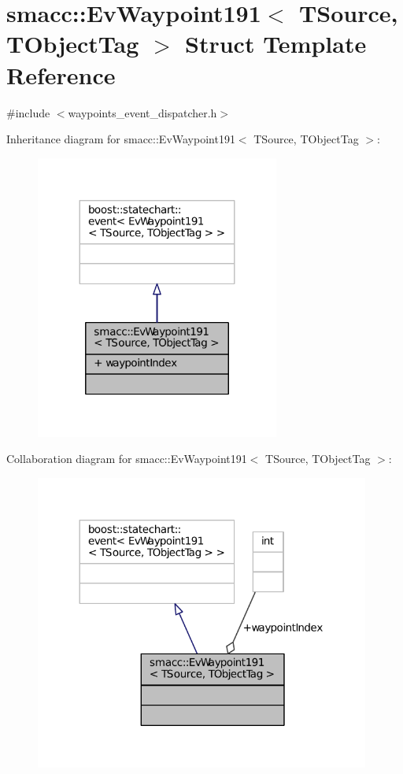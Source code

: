 \hypertarget{structsmacc_1_1EvWaypoint191}{}\section{smacc\+:\+:Ev\+Waypoint191$<$ T\+Source, T\+Object\+Tag $>$ Struct Template Reference}
\label{structsmacc_1_1EvWaypoint191}


{\ttfamily \#include $<$waypoints\+\_\+event\+\_\+dispatcher.\+h$>$}



Inheritance diagram for smacc\+:\+:Ev\+Waypoint191$<$ T\+Source, T\+Object\+Tag $>$\+:
\nopagebreak
\begin{figure}[H]
\begin{center}
\leavevmode
\includegraphics[width=227pt]{structsmacc_1_1EvWaypoint191__inherit__graph}
\end{center}
\end{figure}


Collaboration diagram for smacc\+:\+:Ev\+Waypoint191$<$ T\+Source, T\+Object\+Tag $>$\+:
\nopagebreak
\begin{figure}[H]
\begin{center}
\leavevmode
\includegraphics[width=312pt]{structsmacc_1_1EvWaypoint191__coll__graph}
\end{center}
\end{figure}
